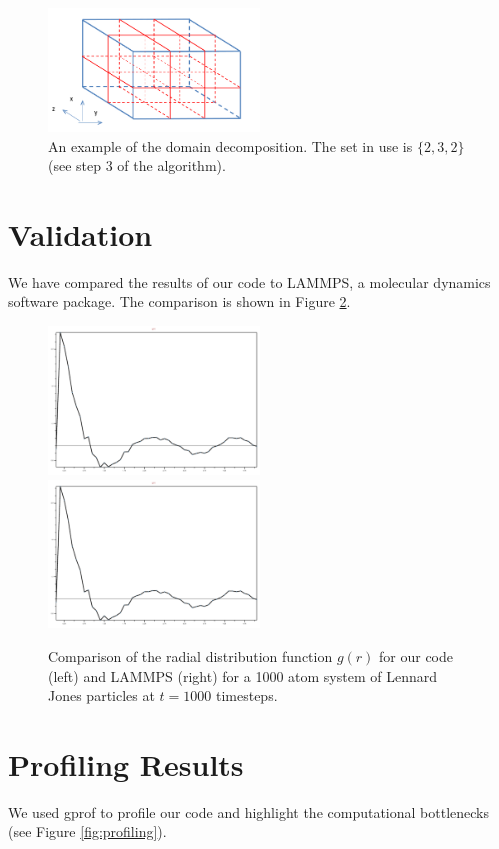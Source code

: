 \documentclass[10pt]{article}
\begin{document}
\begin{figure}[htb]
\includegraphics[width=0.5\textwidth]{ddecomp.jpg}
\caption{An example of the domain decomposition. The set in use is $\{2,3,2\}$ (see step 3 of the algorithm).}
\label{fig:ddecomp}
\end{figure}

\section{Validation}
We have compared the results of our code to LAMMPS, a molecular dynamics software package.
%
The comparison is shown in Figure \ref{fig:validate}.

\begin{figure}[htb]
\includegraphics[width=0.5\textwidth]{gr_1000_cbemd.pdf}
\includegraphics[width=0.5\textwidth]{gr_1000_lammps.pdf}
\caption{Comparison of the radial distribution function $g(r)$ for our code (left) and LAMMPS (right) for a 1000 atom system of Lennard Jones particles at $t=1000$ timesteps.}
\label{fig:validate}
\end{figure}


\section{Profiling Results}
We used gprof to profile our code and highlight the computational bottlenecks (see Figure \ref{fig:profiling}).
\end{document}
